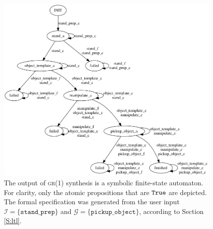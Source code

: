 \begin{figure}[t]
\centering
\includegraphics[width=0.95\columnwidth,clip]{./img/synthesized_automaton.png}
\caption{
	The output of \textsc{gr(1)} synthesis is a symbolic finite-state automaton.
	For clarity, only the atomic propositions that are $\mathtt{True}$ are depicted.
	The formal specification was generated from the user input $\mathcal{I} = \{ \mathtt{stand\_prep} \}$ and $\mathcal{G} = \{ \mathtt{pickup\_object} \}$, according to Section \ref{S:ltl}.
}
\label{Fig:SynthesizedAutomaton}
\end{figure}

